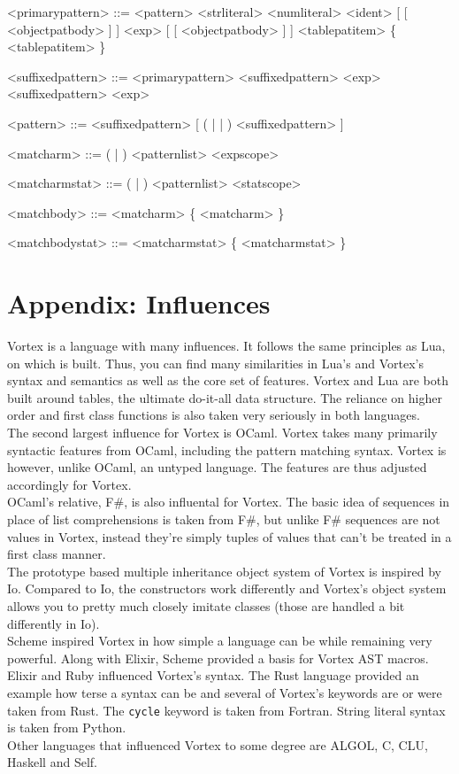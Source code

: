 \documentclass{article}
\newenvironment{bnf}
{
\begin{mdframed}
\begin{grammar}
}
{
\end{grammar}
\end{mdframed}
}
\begin{document}
\begin{bnf}
<primarypattern> ::= \lit{(} <pattern> \lit{)}
    \alt <strliteral>
    \alt <numliteral>
    \alt {}
    \alt {}
    \alt {}
    \alt \lit{_}
    \alt [ \lit{\$} ] <ident> [ \lit{(} [ <objectpatbody> ] \lit{)} ]
    \alt \lit{\$(} <exp> \lit{)} [ \lit{(} [ <objectpatbody> ] \lit{)} ]
    \alt \lit{\{} <tablepatitem> \{ \lit{,} <tablepatitem> \} \lit{\}}

<suffixedpattern> ::= <primarypattern>
    \alt <suffixedpattern>  <exp>
    \alt <suffixedpattern>  <exp>

<pattern> ::= <suffixedpattern>
    [ ( |  | \lit{::}) <suffixedpattern> ]

<matcharm> ::= (\lit{|} | ) <patternlist> <expscope>

<matcharmstat> ::= (\lit{|} | ) <patternlist> <statscope>

<matchbody> ::= <matcharm> \{ <matcharm> \}

<matchbodystat> ::= <matcharmstat> \{ <matcharmstat> \}
\end{bnf}

\section{Appendix: Influences}
Vortex is a language with many influences. It follows the same principles as
Lua, on which is built. Thus, you can find many similarities in Lua's and
Vortex's syntax and semantics as well as the core set of features. Vortex and
Lua are both built around tables, the ultimate do-it-all data structure.
The reliance on higher order and first class functions is also taken very
seriously in both languages.\\
The second largest influence for Vortex is OCaml. Vortex takes many primarily
syntactic features from OCaml, including the pattern matching syntax. Vortex
is however, unlike OCaml, an untyped language. The features are thus adjusted
accordingly for Vortex.\\
OCaml's relative, F\#, is also influental for Vortex. The basic idea of
sequences in place of list comprehensions is taken from F\#, but unlike
F\# sequences are not values in Vortex, instead they're simply tuples
of values that can't be treated in a first class manner.\\
The prototype based multiple inheritance object system of Vortex is inspired
by Io. Compared to Io, the constructors work differently and Vortex's object
system allows you to pretty much closely imitate classes (those are handled
a bit differently in Io).\\
Scheme inspired Vortex in how simple a language can be while remaining very
powerful. Along with Elixir, Scheme provided a basis for Vortex AST macros.\\
Elixir and Ruby influenced Vortex's syntax. The Rust language provided an
example how terse a syntax can be and several of Vortex's keywords are or
were taken from Rust. The \verb|cycle| keyword is taken from Fortran.
String literal syntax is taken from Python.\\
Other languages that influenced Vortex to some degree are ALGOL, C, CLU,
Haskell and Self.
\end{document}
